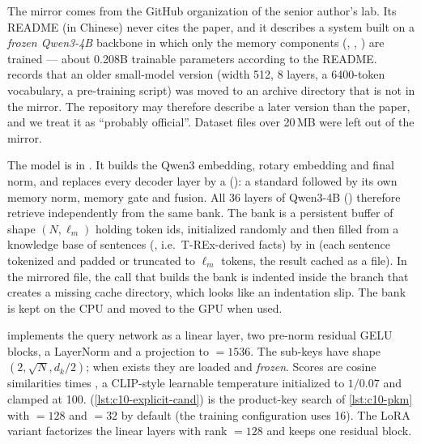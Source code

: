 \begin{implnote}[title={In the code: which version is this?}]
The mirror  comes from the GitHub organization of the senior author's
lab. Its README (in Chinese) never cites the paper, and it describes a system built on a
\emph{frozen Qwen3-4B} backbone in which only the memory components (,
, ) are trained --- about 0.208B trainable parameters
according to the README.  records that an
older small-model version (width 512, 8 layers, a 6400-token vocabulary, a 
pre-training script) was moved to an archive directory that is not in the mirror. The repository
may therefore describe a later version than the paper, and we treat it as ``probably official''.
Dataset files over 20\,MB were left out of the mirror.
\end{implnote}

The model is  in .
It builds the Qwen3 embedding, rotary embedding and final norm, and replaces every decoder layer by
a  ():
a standard  followed by its own memory norm, memory gate and fusion. All 36
layers of Qwen3-4B () therefore
retrieve independently from the same bank. The bank is a persistent buffer of shape
$(N, \ell_m)$ holding token ids, initialized randomly and then filled from a knowledge base of
sentences (, i.e.\ T-REx-derived facts) by
 in 
(each sentence tokenized and padded or truncated to $\ell_m$ tokens, the result cached as a
 file). In the mirrored file, the call that builds the bank is indented inside the branch
that creates a missing cache directory, which looks like an indentation slip. The bank is kept on
the CPU and moved to the GPU when used.

\begin{implnote}[title={In the code: stage 1 (\texttt{MemoryGate})}]
 implements the query network
as a linear layer, two pre-norm residual GELU blocks, a LayerNorm and a projection to
 $= 1536$. The sub-keys  have shape $(2, \sqrt{N}, d_k/2)$; when
 exists they are loaded and \emph{frozen}. Scores are cosine similarities times
, a CLIP-style learnable temperature initialized to $1/0.07$ and clamped at
100.  (\cref{lst:c10-explicit-cand}) is the product-key search of
\cref{lst:c10-pkm} with  $= 128$ and  $= 32$ by
default (the training configuration uses 16). The LoRA variant
 factorizes the linear
layers with rank  $= 128$ and keeps one residual block.
\end{implnote}

